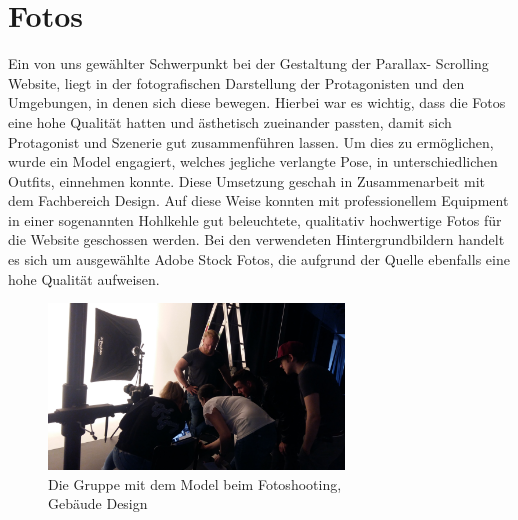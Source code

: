 \section{Fotos}
Ein von uns gewählter Schwerpunkt bei der Gestaltung der Parallax- Scrolling Website, liegt in der fotografischen Darstellung der Protagonisten und den Umgebungen, in denen sich diese bewegen. Hierbei war es wichtig, dass die Fotos eine hohe Qualität hatten und ästhetisch zueinander passten, damit sich Protagonist und Szenerie gut zusammenführen lassen. Um dies zu ermöglichen, wurde ein Model engagiert, welches jegliche verlangte Pose, in unterschiedlichen Outfits, einnehmen konnte. Diese Umsetzung geschah in Zusammenarbeit mit dem Fachbereich Design. Auf diese Weise konnten mit professionellem Equipment in einer sogenannten Hohlkehle gut beleuchtete, qualitativ hochwertige Fotos für die Website geschossen werden.
Bei den verwendeten Hintergrundbildern handelt es sich um ausgewählte Adobe Stock Fotos, die aufgrund der Quelle ebenfalls eine hohe Qualität aufweisen. 
\begin{figure}[H]
	\centering
	\includegraphics[width=0.7\textwidth]{ProjektFotos}
	\caption{Die Gruppe mit dem Model beim Fotoshooting,\\ Gebäude Design\label{ProjektFotos}}
\end{figure}